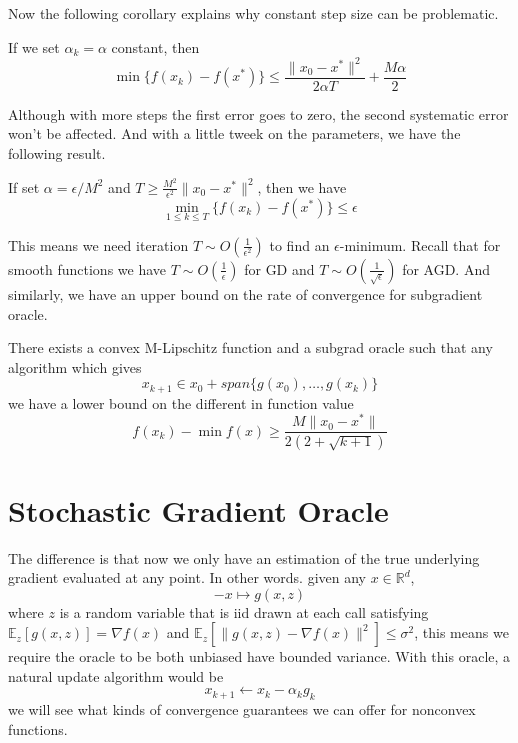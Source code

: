 Now the following corollary explains why constant step size can be problematic.
\begin{corollary}
    If we set $\alpha_k = \alpha$ constant, then 
    \begin{equation*}
        \min \{f(x_k) - f(x^*)\} \leq \frac{\|x_0 - x^*\|^2}{2\alpha T} + \frac{M\alpha}{2}
    \end{equation*}
\end{corollary}

Although with more steps the first error goes to zero, the second systematic error won't be affected. And with a little tweek on the parameters, we have the following result.
\begin{corollary}
    If set $\alpha = \epsilon / M^2$ and $T \geq \frac{M^2}{\epsilon^2} \|x_0 - x^*\|^2$, then we have 
    \begin{equation*}
        \min_{1 \leq k \leq T} \{f(x_k) - f(x^*)\} \leq \epsilon
    \end{equation*}
\end{corollary}

This means we need iteration $T \sim O(\frac{1}{\epsilon^2})$ to find an $\epsilon$-minimum. Recall that for smooth functions we have $T \sim O(\frac{1}{\epsilon})$ for GD and $T \sim O(\frac{1}{\sqrt{\epsilon}})$ for AGD. And similarly, we have an upper bound on the rate of convergence for subgradient oracle.

\begin{theorem}
    There exists a convex M-Lipschitz function and a subgrad oracle such that any algorithm which gives
    \begin{equation*}
        x_{k+1} \in x_0 + span\{g(x_0), \ldots, g(x_k)\}
    \end{equation*}
    we have a lower bound on the different in function value
    \begin{equation*}
        f(x_k) - \min f(x) \geq \frac{M \|x_0 - x^*\|}{2(2 + \sqrt{k+1})}
    \end{equation*}
\end{theorem}

\section{Stochastic Gradient Oracle}
The difference is that now we only have an estimation of the true underlying gradient evaluated at any point. In other words. given any $x \in \mathbb{R}^d$,
\begin{equation*}-
    x \mapsto g(x, z)
\end{equation*}
where $z$ is a random variable that is iid drawn at each call satisfying $\mathbb{E}_z[g(x, z)] = \nabla f(x)$ and $\mathbb{E}_z[\|g(x,z) - \nabla f(x)\|^2] \leq \sigma^2$, this means we require the oracle to be both unbiased have bounded variance. With this oracle, a natural update algorithm would be
\begin{equation*}
    x_{k+1} \leftarrow x_k - \alpha_k g_k
\end{equation*}
we will see what kinds of convergence guarantees we can offer for nonconvex functions.

